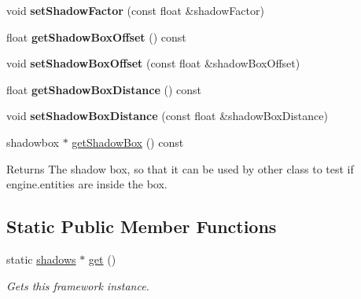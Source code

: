 \begin{DoxyCompactItemize}
\mbox{\label{classflounder_1_1shadows_ae7e3a35984620a77c597cd37f966d8a9}} 
void {\bfseries set\+Shadow\+Factor} (const float \&shadow\+Factor)
\item 
\mbox{\label{classflounder_1_1shadows_af0a5cfe74aade9fa2cdd2a5b8dbc303a}} 
float {\bfseries get\+Shadow\+Box\+Offset} () const
\item 
\mbox{\label{classflounder_1_1shadows_af72c4a704956f64238e955cdb1f53f89}} 
void {\bfseries set\+Shadow\+Box\+Offset} (const float \&shadow\+Box\+Offset)
\item 
\mbox{\label{classflounder_1_1shadows_a8e5ab69909ee0e04474c53dc7a4bb033}} 
float {\bfseries get\+Shadow\+Box\+Distance} () const
\item 
\mbox{\label{classflounder_1_1shadows_a4d31ee9af631c9303d3f7fcc86bf879d}} 
void {\bfseries set\+Shadow\+Box\+Distance} (const float \&shadow\+Box\+Distance)
\item 
\mbox{\label{classflounder_1_1shadows_a683cfc6395bbecfc98aedfd1af4464d1}} 
shadowbox $\ast$ \hyperlink{classflounder_1_1shadows_a683cfc6395bbecfc98aedfd1af4464d1}{get\+Shadow\+Box} () const
\begin{DoxyCompactList}\small\item\em \begin{DoxyReturn}{Returns}
The shadow box, so that it can be used by other class to test if engine.\+entities are inside the box. 
\end{DoxyReturn}
\end{DoxyCompactList}\end{DoxyCompactItemize}
\subsection*{Static Public Member Functions}
\begin{DoxyCompactItemize}
\item 
static \hyperlink{classflounder_1_1shadows}{shadows} $\ast$ \hyperlink{classflounder_1_1shadows_ac1c2ba5a154516b058183f3de8c1a374}{get} ()
\begin{DoxyCompactList}\small\item\em Gets this framework instance. \end{DoxyCompactList}\end{DoxyCompactItemize}
